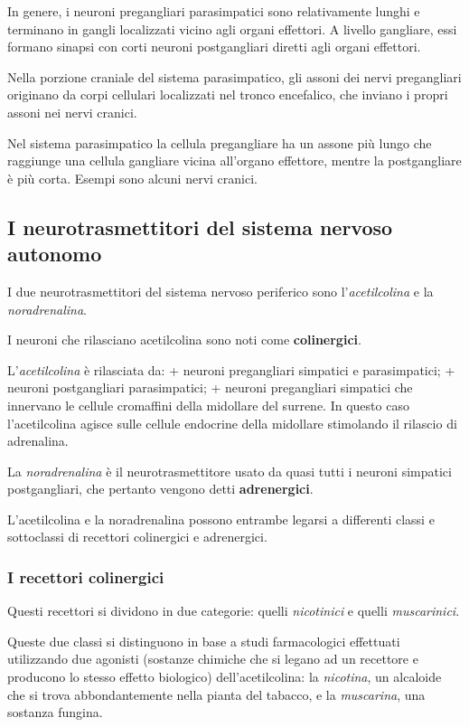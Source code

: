 \documentclass[]{article}
\begin{document}
In genere, i neuroni pregangliari parasimpatici sono relativamente
lunghi e terminano in gangli localizzati vicino agli organi effettori. A
livello gangliare, essi formano sinapsi con corti neuroni postgangliari
diretti agli organi effettori.

Nella porzione craniale del sistema parasimpatico, gli assoni dei nervi
pregangliari originano da corpi cellulari localizzati nel tronco
encefalico, che inviano i propri assoni nei nervi cranici.

Nel sistema parasimpatico la cellula pregangliare ha un assone più lungo
che raggiunge una cellula gangliare vicina all'organo effettore, mentre
la postgangliare è più corta. Esempi sono alcuni nervi cranici.

\subsection{I neurotrasmettitori del sistema nervoso
autonomo}\label{i-neurotrasmettitori-del-sistema-nervoso-autonomo}

I due neurotrasmettitori del sistema nervoso periferico sono
l'\emph{acetilcolina} e la \emph{noradrenalina}.

I neuroni che rilasciano acetilcolina sono noti come
\textbf{colinergici}.

L'\emph{acetilcolina} è rilasciata da: + neuroni pregangliari simpatici
e parasimpatici; + neuroni postgangliari parasimpatici; + neuroni
pregangliari simpatici che innervano le cellule cromaffini della
midollare del surrene. In questo caso l'acetilcolina agisce sulle
cellule endocrine della midollare stimolando il rilascio di adrenalina.

La \emph{noradrenalina} è il neurotrasmettitore usato da quasi tutti i
neuroni simpatici postgangliari, che pertanto vengono detti
\textbf{adrenergici}.

L'acetilcolina e la noradrenalina possono entrambe legarsi a differenti
classi e sottoclassi di recettori colinergici e adrenergici.

\subsubsection{I recettori colinergici}\label{i-recettori-colinergici}

Questi recettori si dividono in due categorie: quelli \emph{nicotinici}
e quelli \emph{muscarinici}.

Queste due classi si distinguono in base a studi farmacologici
effettuati utilizzando due agonisti (sostanze chimiche che si legano ad
un recettore e producono lo stesso effetto biologico) dell'acetilcolina:
la \emph{nicotina}, un alcaloide che si trova abbondantemente nella
pianta del tabacco, e la \emph{muscarina}, una sostanza fungina.
\end{document}
